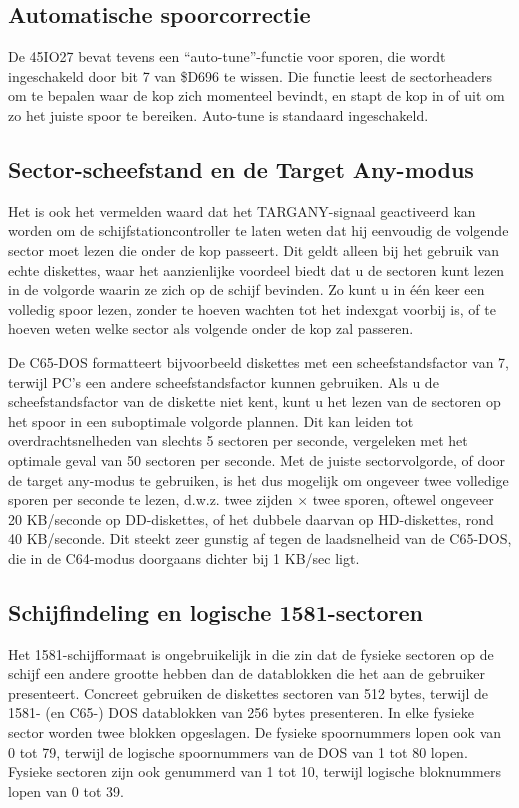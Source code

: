 \subsection{Automatische spoorcorrectie}

De 45IO27 bevat tevens een ``auto-tune''-functie voor sporen, die wordt ingeschakeld door bit 7 van \$D696 te wissen. Die functie leest de sectorheaders om te bepalen waar de kop zich momenteel bevindt, en stapt de kop in of uit om zo het juiste spoor te bereiken. Auto-tune is standaard ingeschakeld.

\subsection{Sector-scheefstand en de Target Any-modus}

Het is ook het vermelden waard dat het TARGANY-signaal geactiveerd kan worden om de schijfstationcontroller te laten weten dat hij eenvoudig de volgende sector moet lezen die onder de kop passeert. Dit geldt alleen bij het gebruik van echte diskettes, waar het aanzienlijke voordeel biedt dat u de sectoren kunt lezen in de volgorde waarin ze zich op de schijf bevinden. Zo kunt u in één keer een volledig spoor lezen, zonder te hoeven wachten tot het indexgat voorbij is, of te hoeven weten welke sector als volgende onder de kop zal passeren.

De C65-DOS formatteert bijvoorbeeld diskettes met een scheefstandsfactor van 7, terwijl PC's een andere scheefstandsfactor kunnen gebruiken. Als u de scheefstandsfactor van de diskette niet kent, kunt u het lezen van de sectoren op het spoor in een suboptimale volgorde plannen. Dit kan leiden tot overdrachtsnelheden van slechts 5 sectoren per seconde, vergeleken met het optimale geval van 50 sectoren per seconde. Met de juiste sectorvolgorde, of door de target any-modus te gebruiken, is het dus mogelijk om ongeveer twee volledige sporen per seconde te lezen, d.w.z. twee zijden $\times$ twee sporen, oftewel ongeveer 20 KB/seconde op DD-diskettes, of het dubbele daarvan op HD-diskettes, rond 40 KB/seconde. Dit steekt zeer gunstig af tegen de laadsnelheid van de C65-DOS, die in de C64-modus doorgaans dichter bij 1 KB/sec ligt.

\subsection{Schijfindeling en logische 1581-sectoren}

Het 1581-schijfformaat is ongebruikelijk in die zin dat de fysieke sectoren op de schijf een andere grootte hebben dan de datablokken die het aan de gebruiker presenteert. Concreet gebruiken de diskettes sectoren van 512 bytes, terwijl de 1581- (en C65-) DOS datablokken van 256 bytes presenteren. In elke fysieke sector worden twee blokken opgeslagen. De fysieke spoornummers lopen ook van 0 tot 79, terwijl de logische spoornummers van de DOS van 1 tot 80 lopen. Fysieke sectoren zijn ook genummerd van 1 tot 10, terwijl logische bloknummers lopen van 0 tot 39.


